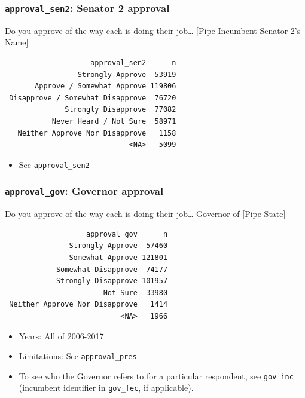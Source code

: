 \documentclass[10pt,article,oneside]{memoir}
\theoremstyle{definition}
\begin{document}
\subsubsection{\texorpdfstring{\texttt{approval\_sen2}: Senator 2
approval}{approval\_sen2: Senator 2 approval}}\label{approval_sen2-senator-2-approval}

Do you approve of the way each is doing their job\ldots{} {[}Pipe
Incumbent Senator 2's Name{]}

\begin{verbatim}
                    approval_sen2      n
                 Strongly Approve  53919
       Approve / Somewhat Approve 119806
 Disapprove / Somewhat Disapprove  76720
              Strongly Disapprove  77082
           Never Heard / Not Sure  58971
   Neither Approve Nor Disapprove   1158
                             <NA>   5099
\end{verbatim}

\begin{itemize}
\tightlist
\item
  See \texttt{approval\_sen2}
\end{itemize}

\subsubsection{\texorpdfstring{\texttt{approval\_gov}: Governor
approval}{approval\_gov: Governor approval}}\label{approval_gov-governor-approval}

Do you approve of the way each is doing their job\ldots{} Governor of
{[}Pipe State{]}

\begin{verbatim}
                   approval_gov      n
               Strongly Approve  57460
               Somewhat Approve 121801
            Somewhat Disapprove  74177
            Strongly Disapprove 101957
                       Not Sure  33980
 Neither Approve Nor Disapprove   1414
                           <NA>   1966
\end{verbatim}

\begin{itemize}
\tightlist
\item
  Years: All of 2006-2017
\item
  Limitations: See \texttt{approval\_pres}
\item
  To see who the Governor refers to for a particular respondent, see
  \texttt{gov\_inc} (incumbent identifier in \texttt{gov\_fec}, if
  applicable).
\end{itemize}
\end{document}
